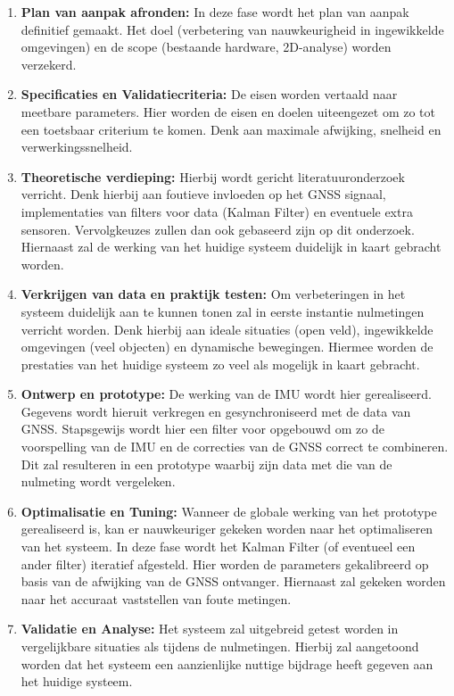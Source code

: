 \begin{enumerate}
    \item \textbf{Plan van aanpak afronden:} In deze fase wordt het plan van aanpak definitief gemaakt. Het doel (verbetering van nauwkeurigheid in ingewikkelde omgevingen) en de scope (bestaande hardware, 2D-analyse) worden verzekerd. 
    \item \textbf{Specificaties en Validatiecriteria:} De eisen worden vertaald naar meetbare parameters. Hier worden de eisen en doelen uiteengezet om zo tot een toetsbaar criterium te komen. Denk aan maximale afwijking, snelheid en verwerkingssnelheid.
    \item \textbf{Theoretische verdieping:} Hierbij wordt gericht literatuuronderzoek verricht. Denk hierbij aan foutieve invloeden op het GNSS signaal, implementaties van filters voor data (Kalman Filter) en eventuele extra sensoren. Vervolgkeuzes zullen dan ook gebaseerd zijn op dit onderzoek. Hiernaast zal de werking van het huidige systeem duidelijk in kaart gebracht worden.
    \item \textbf{Verkrijgen van data en praktijk testen:} Om verbeteringen in het systeem duidelijk aan te kunnen tonen zal in eerste instantie nulmetingen verricht worden. Denk hierbij aan ideale situaties (open veld), ingewikkelde omgevingen (veel objecten) en dynamische bewegingen. Hiermee worden de prestaties van het huidige systeem zo veel als mogelijk in kaart gebracht. 
    \item \textbf{Ontwerp en prototype:} De werking van de IMU wordt hier gerealiseerd. Gegevens wordt hieruit verkregen en gesynchroniseerd met de data van GNSS. Stapsgewijs wordt hier een filter voor opgebouwd om zo de voorspelling van de IMU en de correcties van de GNSS correct te combineren. Dit zal resulteren in een prototype waarbij zijn data met die van de nulmeting wordt vergeleken. 
    \item \textbf{Optimalisatie en Tuning:} Wanneer de globale werking van het prototype gerealiseerd is, kan er nauwkeuriger gekeken worden naar het optimaliseren van het systeem. In deze fase wordt het Kalman Filter (of eventueel een ander filter) iteratief afgesteld. Hier worden de parameters gekalibreerd op basis van de afwijking van de GNSS ontvanger. Hiernaast zal gekeken worden naar het accuraat vaststellen van foute metingen.
    \item \textbf{Validatie en Analyse:} Het systeem zal uitgebreid getest worden in vergelijkbare situaties als tijdens de nulmetingen. Hierbij zal aangetoond worden dat het systeem een aanzienlijke nuttige bijdrage heeft gegeven aan het huidige systeem. 
\end{enumerate}

